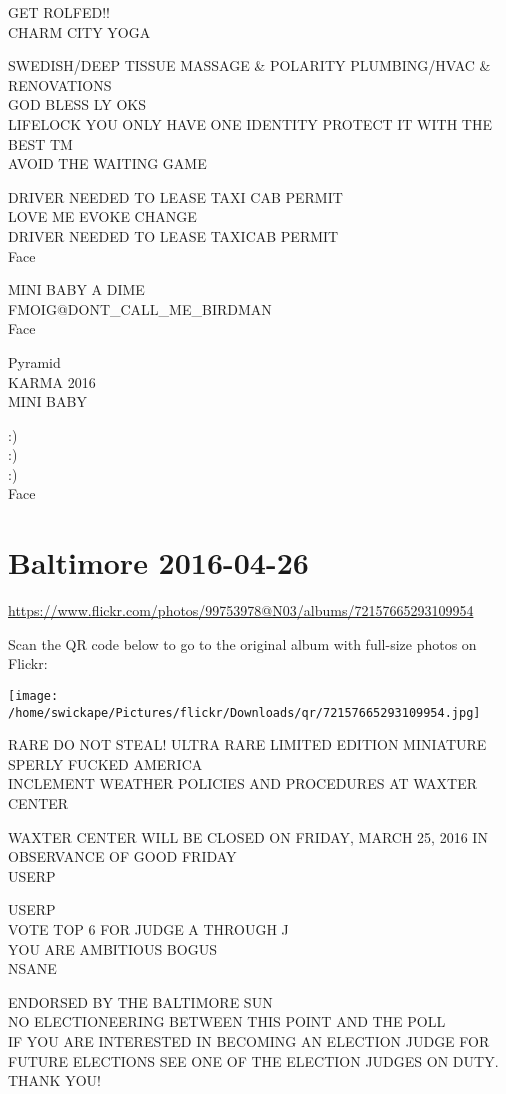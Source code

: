 \documentclass[10pt,letterpaper]{article}
\begin{document}
GET ROLFED!!\\
CHARM CITY YOGA

SWEDISH/DEEP TISSUE MASSAGE \& POLARITY PLUMBING/HVAC \& RENOVATIONS\\
GOD BLESS LY OKS\\
LIFELOCK YOU ONLY HAVE ONE IDENTITY PROTECT IT WITH THE BEST TM\\
AVOID THE WAITING GAME

DRIVER NEEDED TO LEASE TAXI CAB PERMIT\\
LOVE ME EVOKE CHANGE\\
DRIVER NEEDED TO LEASE TAXICAB PERMIT\\
Face

MINI BABY A DIME\\
FMOIG@DONT\_CALL\_ME\_BIRDMAN\\
Face

Pyramid\\
KARMA 2016\\
MINI BABY

:)\\
:)\\
:)\\
Face
\pagebreak

\section*{Baltimore 2016-04-26}

\url{https://www.flickr.com/photos/99753978@N03/albums/72157665293109954}

Scan the QR code below to go to the original album with full-size photos on Flickr:

\texttt{[image: /home/swickape/Pictures/flickr/Downloads/qr/72157665293109954.jpg]}
\pagebreak

RARE DO NOT STEAL!  ULTRA RARE LIMITED EDITION MINIATURE\\
SPERLY FUCKED AMERICA\\
INCLEMENT WEATHER POLICIES AND PROCEDURES AT WAXTER CENTER

WAXTER CENTER WILL BE CLOSED ON FRIDAY, MARCH 25, 2016 IN OBSERVANCE OF GOOD FRIDAY\\
USERP

USERP\\
VOTE TOP 6 FOR JUDGE A THROUGH J\\
YOU ARE AMBITIOUS BOGUS\\
NSANE

ENDORSED BY THE BALTIMORE SUN\\
NO ELECTIONEERING BETWEEN THIS POINT AND THE POLL\\
IF YOU ARE INTERESTED IN BECOMING AN ELECTION JUDGE FOR FUTURE ELECTIONS SEE ONE OF THE ELECTION JUDGES ON DUTY.  THANK YOU!
\end{document}
